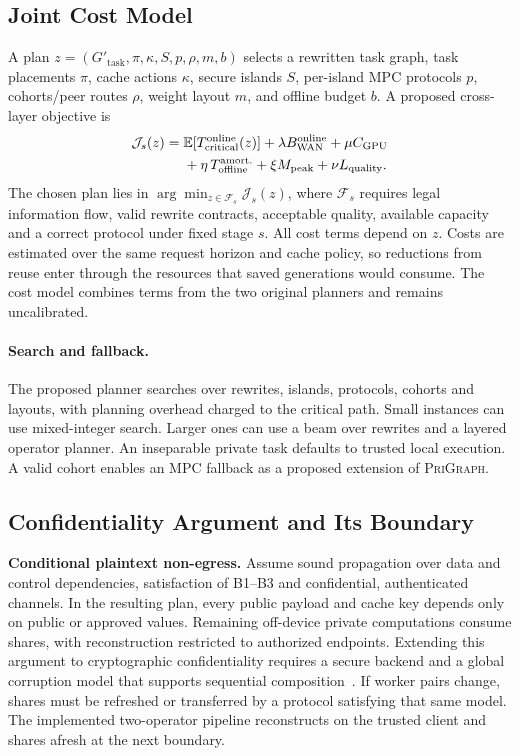 \documentclass[runningheads]{llncs}
\newcommand{\J}{\mathcal{J}}
\newcommand{\Gtnew}{G'_{\mathrm{task}}}
\newcommand{\srcA}{\textsc{PriGraph}}
\begin{document}
\subsection{Joint Cost Model}
A plan $z=(\Gtnew,\pi,\kappa,S,p,\rho,m,b)$ selects a rewritten task graph, task placements $\pi$, cache actions $\kappa$, secure islands $S$, per-island MPC protocols $p$, cohorts/peer routes $\rho$, weight layout $m$, and offline budget $b$. A proposed cross-layer objective is
\begin{equation}\label{eq:obj}
\begin{aligned}
\J_s(z)={}&\mathbb{E}[T_{\rm critical}^{\rm online}(z)]
+\lambda B_{\rm WAN}^{\rm online}+\mu C_{\rm GPU}\\
&+\eta\,T_{\rm offline}^{\rm amort.}+\xi M_{\rm peak}
+\nu L_{\rm quality}.
\end{aligned}
\end{equation}
The chosen plan lies in $\arg\min_{z\in\mathcal{F}_s}\J_s(z)$, where
$\mathcal{F}_s$ requires legal information flow, valid rewrite contracts,
acceptable quality, available capacity and a correct protocol under fixed
stage $s$. All cost terms depend on $z$. Costs are estimated over the same
request horizon and cache policy, so reductions from reuse enter through the
resources that saved generations would consume. The cost model combines
terms from the two original planners and remains uncalibrated.

\paragraph{Search and fallback.}
The proposed planner searches over rewrites, islands, protocols, cohorts
and layouts, with planning overhead charged to the critical path. Small
instances can use mixed-integer search. Larger ones can use a beam over
rewrites and a layered operator planner. An inseparable private task
defaults to trusted local execution. A valid cohort enables an
MPC fallback as a proposed extension of \srcA{}.

\subsection{Confidentiality Argument and Its Boundary}
\textbf{Conditional plaintext non-egress.} Assume sound propagation over
data and control dependencies, satisfaction of B1--B3 and confidential,
authenticated channels. In the resulting plan, every public payload and
cache key depends only on public or approved values. Remaining off-device
private computations consume shares, with reconstruction restricted to
authorized endpoints. Extending this argument to cryptographic
confidentiality requires a secure backend and a global corruption model
that supports sequential composition~\cite{canetti}. If worker pairs change,
shares must be refreshed or transferred by a protocol satisfying that same
model. The implemented two-operator pipeline reconstructs on the trusted
client and shares afresh at the next boundary.
\end{document}
